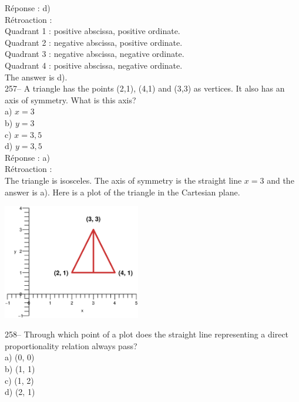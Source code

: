 \documentclass[letterpaper, 12pt]{article}
\begin{document}
R\'eponse : d)\\

R\'etroaction : \\
Quadrant 1 : positive abscissa, positive ordinate.\\
Quadrant 2 : negative abscissa, positive ordinate.\\
Quadrant 3 : negative abscissa, negative ordinate.\\
Quadrant 4 : positive abscissa, negative ordinate.\\

The answer is d).\\

257-- A triangle has the points (2,1), (4,1) and
(3,3) as vertices. It also has an axis of symmetry. What is this axis?\\

a) $x=3$\\
b) $y=3$\\
c) $x=3,5$\\
d) $y=3,5$\\

R\'eponse : a)\\

R\'etroaction : \\
The triangle is isosceles. The axis of symmetry is the straight
line $x=3$ and the answer is a). Here is a plot of the triangle
in the Cartesian plane.\\
    \begin{center}
    \includegraphics[width=6cm]{triangle25.eps}
    \end{center}


258-- Through which point of a plot does the straight line
representing a direct proportionality relation always pass?\\

a) (0, 0)\\
b) (1, 1)\\
c) (1, 2)\\
d) (2, 1)\\
\end{document}

